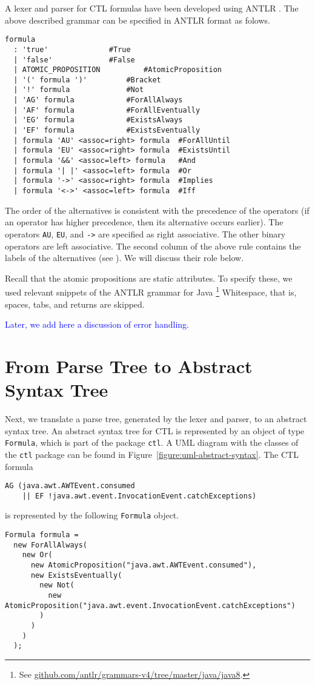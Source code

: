 \documentclass[12pt]{article}
\theoremstyle{definition}
\begin{document}
A lexer and parser for CTL formulas have been developed using ANTLR \cite{P13}.  The above described grammar can be specified in ANTLR format as folows.
\begin{lstlisting}
formula
  : 'true'				#True
  | 'false'				#False
  | ATOMIC_PROPOSITION			#AtomicProposition
  | '(' formula ')'			#Bracket
  | '!' formula				#Not
  | 'AG' formula			#ForAllAlways
  | 'AF' formula			#ForAllEventually
  | 'EG' formula			#ExistsAlways
  | 'EF' formula			#ExistsEventually
  | formula 'AU' <assoc=right> formula  #ForAllUntil
  | formula 'EU' <assoc=right> formula  #ExistsUntil
  | formula '&&' <assoc=left> formula	#And
  | formula '| |' <assoc=left> formula  #Or
  | formula '->' <assoc=right> formula  #Implies
  | formula '<->' <assoc=left> formula	#Iff
\end{lstlisting}
The order of the alternatives is consistent with the precedence of the operators (if an operator has higher precedence, then its alternative occurs earlier).  The operators \lstinline{AU}, \lstinline{EU}, and \lstinline{->} are specified as right associative.  The other binary operators are left associative.  The second column of the above rule contains the labels of the alternatives (see \cite[Section~8.2]{P13}).  We will discuss their role below.

Recall that the atomic propositions are static attributes.  To specify these, we used relevant snippets of the ANTLR grammar for Java%
\footnote{See \href{https://github.com/antlr/grammars-v4/tree/master/java/java8}{github.com/antlr/grammars-v4/tree/master/java/java8}.}
Whitespace, that is, spaces, tabs, and returns are skipped.

\textcolor{blue}{Later, we add here a discussion of error handling.}

\section{From Parse Tree to Abstract Syntax Tree}

Next, we translate a parse tree, generated by the lexer and parser, to an abstract syntax tree.  An abstract syntax tree for CTL is represented by an object of type \lstinline{Formula}, which is part of the package \lstinline{ctl}.  A UML diagram with the classes of the \lstinline{ctl} package can be found in Figure~\ref{figure:uml-abstract-syntax}.  The CTL formula
\begin{lstlisting}
AG (java.awt.AWTEvent.consumed 
    || EF !java.awt.event.InvocationEvent.catchExceptions)
\end{lstlisting}
is represented by the following \lstinline{Formula} object.
\begin{lstlisting}
Formula formula =
  new ForAllAlways(
    new Or(
      new AtomicProposition("java.awt.AWTEvent.consumed"),
      new ExistsEventually(
        new Not(
          new AtomicProposition("java.awt.event.InvocationEvent.catchExceptions")
        )
      )
    )
  );
\end{lstlisting}
\end{document}

